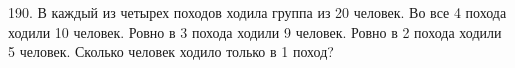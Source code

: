 190. В каждый из четырех походов ходила группа из 20 человек. Во все 4 похода ходили 10 человек. Ровно в 3 похода ходили 9 человек. Ровно в 2 похода ходили 5 человек. Сколько человек ходило только в 1 поход?\\
